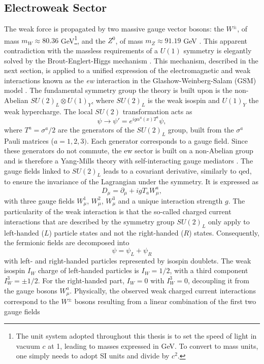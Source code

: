 \subsection{Electroweak Sector}
The weak force is propagated by two massive gauge vector bosons: the $W^{\pm}$, of mass $m_W \approx 80.36$ GeV\footnote{The unit system adopted throughout this thesis is to set the speed of light in vacuum $c$ at 1, leading to masses expressed in GeV. To convert to mass units, one simply needs to adopt SI units and divide by $c^2$.}, and the $Z^0$, of mass $m_Z \approx 91.19$ GeV \cite{Tanabashi:2018oca}. This apparent contradiction with the massless requirements of a $U(1)$ symmetry is elegantly solved by the Brout-Englert-Higgs mechanism \cite{Englert:1964et, PhysRevLett.13.508}. This mechanism, described in the next section, is applied to a unified expression of the electromagnetic and weak interactions known as the \textit{\gls{ew}} interaction in the Glashow-Weinberg-Salam (GSM) model \cite{GLASHOW1961579, PhysRevLett.19.1264, Salam:1968rm}. The fundamental symmetry group the theory is built upon is the non-Abelian $SU(2)_L \otimes U(1)_Y$, where $SU(2)_L$ is the weak isospin and $U(1)_Y$ the weak hypercharge. The local $SU(2)$ transformation acts as
\begin{equation}\label{eq-GaugeSU2}
    \psi \rightarrow \psi' = e^{i g \alpha^a(x) T^a } \psi,
\end{equation}
where $T^a = \sigma^a / 2$ are the generators of the $SU(2)_L$ group, built from the $\sigma^a$ Pauli matrices ($a = 1, 2, 3)$. Each generator corresponds to a gauge field. Since these generators do not commute, the \gls{ew} sector is built on a non-Abelian group and is therefore a Yang-Mills theory with self-interacting gauge mediators \cite{PhysRev.96.191}. The gauge fields linked to $SU(2)_L$ leads to a covariant derivative, similarly to \gls{qed}, to ensure the invariance of the Lagrangian under the symmetry. It is expressed as
\begin{equation}\label{eq-CovDerSU2}
   D_{\mu}  = \partial_{\mu} + igT_a W_{\mu}^a,
\end{equation}
with three gauge fields $W_{\mu}^1$, $W_{\mu}^2$, $W_{\mu}^3$ and a unique interaction strength $g$. The particularity of the weak interaction is that the so-called charged current interactions that are described by the symmetry group $SU(2)_L$ only apply to left-handed ($L$) particle states and not the right-handed ($R$) states. Consequently, the fermionic fields are decomposed into \[\psi = \psi_L + \psi_R\] with left- and right-handed particles represented by isospin doublets. The weak isospin $I_W$ charge of left-handed particles is $I_W = 1/2$, with a third component $I_W^3 = \pm  1/2$. For the right-handed part, $I_W = 0$ with $I_W^3 = 0$, decoupling it from the gauge bosons $W_{\mu}^a$. Physically, the observed weak charged current interactions correspond to the $W^{\pm}$ bosons resulting from a linear combination of the first two gauge fields
